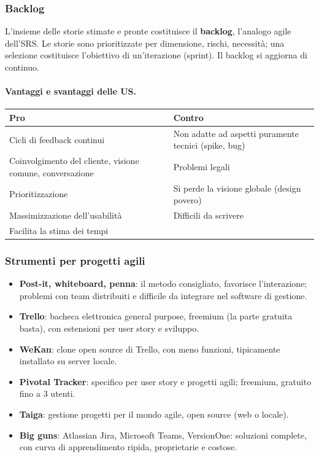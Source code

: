 \documentclass[a4paper,12pt]{article}
\begin{document}
\subsubsection{Backlog}
L'insieme delle storie stimate e pronte costituisce il \textbf{backlog}, l'analogo agile
dell'SRS. Le storie sono prioritizzate per dimensione, rischi, necessità; una selezione
costituisce l'obiettivo di un'iterazione (sprint). Il backlog si aggiorna di continuo.

\paragraph{Vantaggi e svantaggi delle US.}
\begin{center}
\begin{tabular}{|p{7.2cm}|p{7.2cm}|}
\hline
\textbf{Pro} & \textbf{Contro}\\
\hline
Cicli di feedback continui & Non adatte ad aspetti puramente tecnici (spike, bug)\\
Coinvolgimento del cliente, visione comune, conversazione & Problemi legali\\
Prioritizzazione & Si perde la visione globale (design povero)\\
Massimizzazione dell'usabilità & Difficili da scrivere\\
Facilita la stima dei tempi & \\
\hline
\end{tabular}
\end{center}

\subsubsection{Strumenti per progetti agili}
\begin{itemize}
  \item \textbf{Post-it, whiteboard, penna}: il metodo consigliato, favorisce
        l'interazione; problemi con team distribuiti e difficile da integrare nel
        software di gestione.
  \item \textbf{Trello}: bacheca elettronica general purpose, freemium (la parte gratuita
        basta), con estensioni per user story e sviluppo.
  \item \textbf{WeKan}: clone open source di Trello, con meno funzioni, tipicamente
        installato su server locale.
  \item \textbf{Pivotal Tracker}: specifico per user story e progetti agili; freemium,
        gratuito fino a 3 utenti.
  \item \textbf{Taiga}: gestione progetti per il mondo agile, open source (web o locale).
  \item \textbf{Big guns}: Atlassian Jira, Microsoft Teams, VersionOne: soluzioni complete,
        con curva di apprendimento ripida, proprietarie e costose.
\end{itemize}
\end{document}

